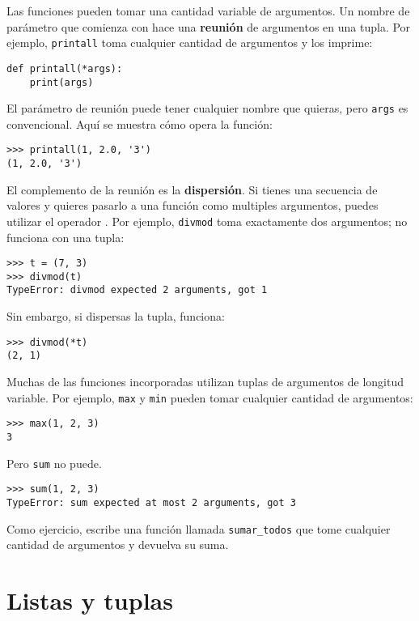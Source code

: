 \documentclass[10pt]{book}
\begin{document}
Las funciones pueden tomar una cantidad variable de argumentos.  Un nombre de parámetro
que comienza con {\tt *} hace una {\bf reunión} de argumentos en
una tupla.  Por ejemplo, {\tt printall}
toma cualquier cantidad de argumentos y los imprime:

\begin{verbatim}
def printall(*args):
    print(args)
\end{verbatim}
%
El parámetro de reunión puede tener cualquier nombre que quieras, pero {\tt args} es
convencional.  Aquí se muestra cómo opera la función:

\begin{verbatim}
>>> printall(1, 2.0, '3')
(1, 2.0, '3')
\end{verbatim}
%
El complemento de la reunión es la {\bf dispersión}.  Si tienes una
secuencia de valores y quieres pasarlo a una función
como multiples argumentos, puedes utilizar el operador {\tt *}.
Por ejemplo, {\tt divmod} toma exactamente dos argumentos;
no funciona con una tupla:

\begin{verbatim}
>>> t = (7, 3)
>>> divmod(t)
TypeError: divmod expected 2 arguments, got 1
\end{verbatim}
%
Sin embargo, si dispersas la tupla, funciona:

\begin{verbatim}
>>> divmod(*t)
(2, 1)
\end{verbatim}
%
Muchas de las funciones incorporadas utilizan
tuplas de argumentos de longitud variable.  Por ejemplo, {\tt max}
y {\tt min} pueden tomar cualquier cantidad de argumentos:

\begin{verbatim}
>>> max(1, 2, 3)
3
\end{verbatim}
%
Pero {\tt sum} no puede.

\begin{verbatim}
>>> sum(1, 2, 3)
TypeError: sum expected at most 2 arguments, got 3
\end{verbatim}
%
Como ejercicio, escribe una función llamada \verb"sumar_todos" que tome cualquier cantidad
de argumentos y devuelva su suma.


\section{Listas y tuplas}
\end{document}
